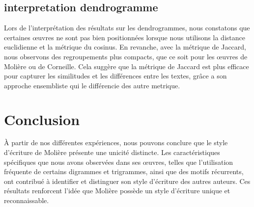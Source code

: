 \documentclass[]{report}
\begin{document}
\subsection{interpretation dendrogramme}

Lors de l'interprétation des résultats sur les dendrogrammes, nous constatons
que certaines œuvres ne sont pas bien positionnées lorsque nous utilisons la
distance euclidienne et la métrique du cosinus. En revanche, avec la métrique de
Jaccard, nous observons des regroupements plus compacts, que ce soit pour les
œuvres de Molière ou de Corneille. Cela suggère que la métrique de Jaccard est
plus efficace pour capturer les similitudes et les différences entre les textes,
grâce a son approche ensembliste qui le différencie des autre metrique.


\section{Conclusion}
\vspace{\baselineskip}
\hspace{0,5cm} À partir de nos différentes expériences, nous pouvons conclure
que le style d'écriture de Molière présente une unicité distincte. Les
caractéristiques spécifiques que nous avons observées dans ses œuvres, telles
que l'utilisation fréquente de certains digrammes et trigrammes, ainsi que des
motifs récurrents, ont contribué à identifier et distinguer son style d'écriture
des autres auteurs. Ces résultats renforcent l'idée que Molière possède un style
d'écriture unique et reconnaissable.
\end{document}
